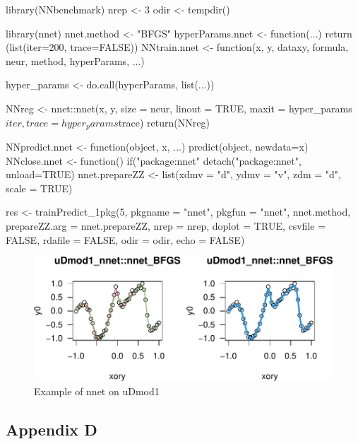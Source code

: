\begin{Schunk}
\begin{Sinput}
library(NNbenchmark)
nrep <- 3       
odir <- tempdir()

library(nnet)
nnet.method <- "BFGS"
hyperParams.nnet <- function(...) {
    return (list(iter=200, trace=FALSE))
}
NNtrain.nnet <- function(x, y, dataxy, formula, neur, method, hyperParams, ...) {
    
    hyper_params <- do.call(hyperParams, list(...))
    
    NNreg <- nnet::nnet(x, y, size = neur, linout = TRUE, 
                        maxit = hyper_params$iter, trace=hyper_params$trace)
    return(NNreg)
}
NNpredict.nnet  <- function(object, x, ...) { predict(object, newdata=x) }
NNclose.nnet    <- function() {  if("package:nnet" %
                                detach("package:nnet", unload=TRUE) }
nnet.prepareZZ  <- list(xdmv = "d", ydmv = "v", zdm = "d", scale = TRUE)
\end{Sinput}
\end{Schunk}

\begin{Schunk}
\begin{Sinput}
res <- trainPredict_1pkg(5, pkgname = "nnet", pkgfun = "nnet", nnet.method,
  prepareZZ.arg = nnet.prepareZZ, nrep = nrep, doplot = TRUE,
  csvfile = FALSE, rdafile = FALSE, odir = odir, echo = FALSE)
\end{Sinput}
\begin{figure}

{\centering \includegraphics{unnamed-chunk-8-1} 

}

\caption[Example of nnet on uDmod1]{Example of nnet on uDmod1}\label{fig:unnamed-chunk-8}
\end{figure}
\end{Schunk}

\hypertarget{appendix-d}{%
\subsection{Appendix D}\label{appendix-d}}

